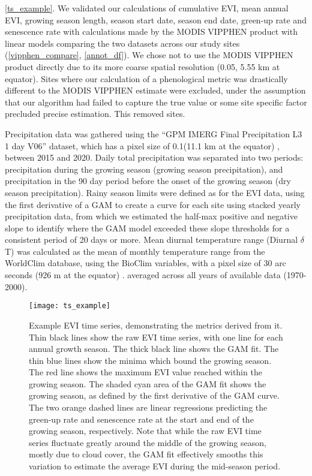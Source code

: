 \documentclass[11pt,a4paper]{article}
\begin{document}
\autoref{ts_example}. We validated our calculations of cumulative EVI, mean
annual EVI, growing season length, season start date, season end date, green-up
rate and senescence rate with calculations made by the MODIS VIPPHEN product
with linear models comparing the two datasets across our study sites
(\autoref{vipphen_compare}, \autoref{annot_df}). We chose not to use the MODIS
VIPPHEN product directly due to its more coarse spatial resolution
(0.05\textdegree, 5.55 km at equator). Sites where our calculation of
a phenological metric was drastically different to the MODIS VIPPHEN estimate
were excluded, under the assumption that our algorithm had failed to capture the
true value or some site specific factor precluded precise estimation. This
removed \vipphenOutlier{} sites. 

Precipitation data was gathered using the ``GPM IMERG Final Precipitation L3 1 day V06'' dataset, which has a pixel size of 0.1\textdegree (11.1 km at the equator) \citep{GPM}, between 2015 and 2020. Daily total precipitation was separated into two periods: precipitation during the growing season (growing season precipitation), and precipitation in the 90 day period before the onset of the growing season (dry season precipitation). Rainy season limits were defined as for the EVI data, using the first derivative of a GAM to create a curve for each site using stacked yearly precipitation data, from which we estimated the half-max positive and negative slope to identify where the GAM model exceeded these slope thresholds for a consistent period of 20 days or more. Mean diurnal temperature range (Diurnal $\delta$T) was calculated as the mean of monthly temperature range from the WorldClim database, using the BioClim variables, with a pixel size of 30 arc seconds (926 m at the equator) \citep{Fick2017}. averaged across all years of available data (1970-2000).

\begin{figure}[H]
\centering
	\texttt{[image: ts\_example]}
	\caption{Example EVI time series, demonstrating the metrics derived from it. Thin black lines show the raw EVI time series, with one line for each annual growth season. The thick black line shows the GAM fit. The thin blue lines show the minima which bound the growing season. The red line shows the maximum EVI value reached within the growing season. The shaded cyan area of the GAM fit shows the growing season, as defined by the first derivative of the GAM curve. The two orange dashed lines are linear regressions predicting the green-up rate and senescence rate at the start and end of the growing season, respectively. Note that while the raw EVI time series fluctuate greatly around the middle of the growing season, mostly due to cloud cover, the GAM fit effectively smooths this variation to estimate the average EVI during the mid-season period.}
	\label{ts_example}
\end{figure}
\end{document}
